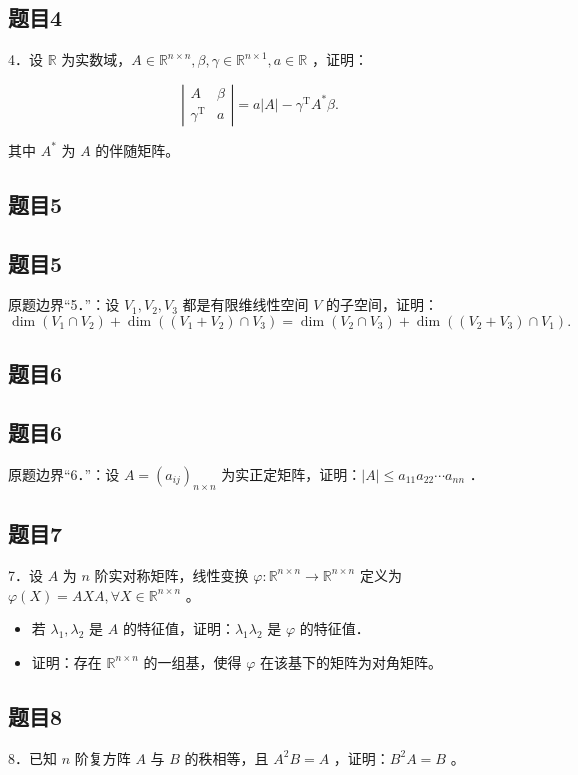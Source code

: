 \documentclass{article}
\begin{document}
\subsection{题目4}
4．设 \(\mathbb{R}\) 为实数域，\(A \in \mathbb{R}^{n \times n}, \beta, \gamma \in \mathbb{R}^{n \times 1}, a \in \mathbb{R}\) ，证明：

\[
\left|\begin{array}{cc}
A & \beta \\
\gamma^{\mathrm{T}} & a
\end{array}\right|=a|A|-\gamma^{\mathrm{T}} A^{*} \beta .
\]

其中 \(A^{*}\) 为 \(A\) 的伴随矩阵。

\begin{itemize}

\subsection{题目5}
\end{itemize}

\subsection{题目5}
原题边界“5．”：设 \(V_{1}, V_{2}, V_{3}\) 都是有限维线性空间 \(V\) 的子空间，证明：
\[
\operatorname{dim}\left(V_{1} \cap V_{2}\right)+\operatorname{dim}\left(\left(V_{1}+V_{2}\right) \cap V_{3}\right)=\operatorname{dim}\left(V_{2} \cap V_{3}\right)+\operatorname{dim}\left(\left(V_{2}+V_{3}\right) \cap V_{1}\right) .
\]

\subsection{题目6}

\subsection{题目6}
原题边界“6．”：设 \(A=\left(a_{i j}\right)_{n \times n}\) 为实正定矩阵，证明：\(|A| \leq a_{11} a_{22} \cdots a_{n n}\) ．

\subsection{题目7}
7．设 \(A\) 为 \(n\) 阶实对称矩阵，线性变换 \(\varphi: \mathbb{R}^{n \times n} \rightarrow \mathbb{R}^{n \times n}\) 定义为 \(\varphi(X)=A X A, \forall X \in \mathbb{R}^{n \times n}\) 。

\begin{itemize}
  \item[（1）] 若 \(\lambda_{1}, \lambda_{2}\) 是 \(A\) 的特征值，证明：\(\lambda_{1} \lambda_{2}\) 是 \(\varphi\) 的特征值．
  \item[（2）] 证明：存在 \(\mathbb{R}^{n \times n}\) 的一组基，使得 \(\varphi\) 在该基下的矩阵为对角矩阵。
\end{itemize}

\subsection{题目8}
8．已知 \(n\) 阶复方阵 \(A\) 与 \(B\) 的秩相等，且 \(A^{2} B=A\) ，证明：\(B^{2} A=B\) 。
\end{document}
